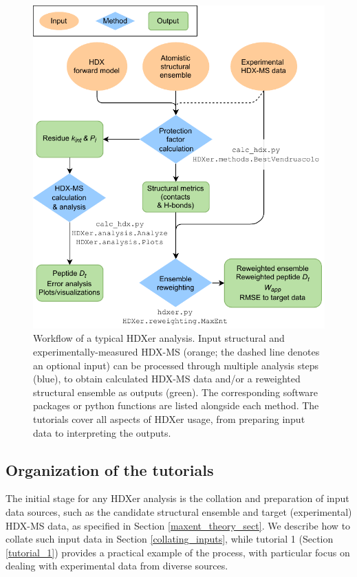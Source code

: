 \documentclass[9pt,tutorial,ASAPversion]{livecoms}
\begin{document}
\begin{figure}[t]
    \includegraphics[width=0.98\linewidth]{Fig2_HDXer_workflow_vertical_v2.pdf}
    \caption{Workflow of a typical HDXer analysis. Input structural and experimentally-measured HDX-MS (orange; the dashed line denotes an optional input) can be processed through multiple analysis steps (blue), to obtain calculated HDX-MS data and/or a reweighted structural ensemble as outputs (green). The corresponding software packages or python functions are listed alongside each method. The tutorials cover all aspects of HDXer usage, from preparing input data to interpreting the outputs.}
    \label{fig:workflowfig}
\end{figure}

\subsection{Organization of the tutorials}
The initial stage for any HDXer analysis is the collation and preparation of input data sources, such as the candidate structural ensemble and target (experimental) HDX-MS data, as specified in Section \ref{maxent_theory_sect}. 
We describe how to collate such input data in Section \ref{collating_inputs}, while tutorial 1 (Section \ref{tutorial_1}) provides a practical example of the process, with particular focus on dealing with experimental data from diverse sources.
\end{document}
